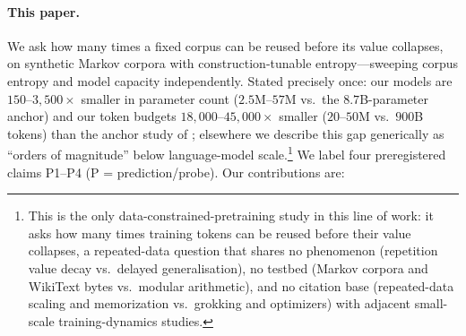 \documentclass[11pt]{article}
\begin{document}
\paragraph{This paper.}
We ask how many times a fixed corpus can be reused before its value collapses, on
synthetic Markov corpora with construction-tunable entropy---sweeping corpus entropy
and model capacity independently. Stated precisely once: our models are
$150$--$3{,}500\times$ smaller in parameter count ($2.5$M--$57$M vs.\ the
$8.7$B-parameter anchor) and our token budgets $18{,}000$--$45{,}000\times$ smaller
($20$--$50$M vs.\ $900$B tokens) than the anchor study of
\citet{muennighoff2023scaling}; elsewhere we describe this gap generically as
``orders of magnitude'' below language-model scale.\footnote{This is the only data-constrained-pretraining study in this line of
work: it asks how many times training tokens can be reused before their value
collapses, a repeated-data question that shares no phenomenon (repetition value decay
vs.\ delayed generalisation), no testbed (Markov corpora and WikiText bytes vs.\
modular arithmetic), and no citation base (repeated-data scaling and memorization vs.\
grokking and optimizers) with adjacent small-scale training-dynamics studies.} We
label four preregistered claims P1--P4 (P = prediction/probe). Our contributions are:
\end{document}
